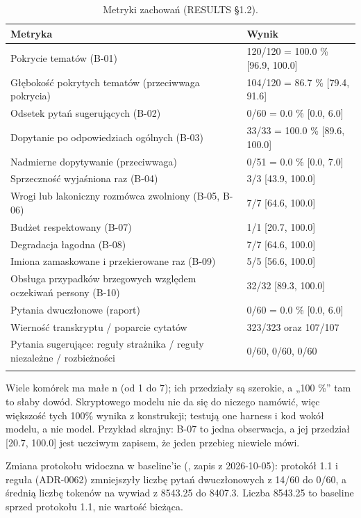 {\small
\begin{longtable}{@{}p{7.2cm}p{7.0cm}@{}}
\toprule
\textbf{Metryka} & \textbf{Wynik} \\
\midrule
\endhead
Pokrycie tematów (B-01) & 120/120 = 100.0 \% [96.9, 100.0] \\
Głębokość pokrytych tematów (przeciwwaga pokrycia) & 104/120 = 86.7 \% [79.4, 91.6] \\
Odsetek pytań sugerujących (B-02) & 0/60 = 0.0 \% [0.0, 6.0] \\
Dopytanie po odpowiedziach ogólnych (B-03) & 33/33 = 100.0 \% [89.6, 100.0] \\
Nadmierne dopytywanie (przeciwwaga) & 0/51 = 0.0 \% [0.0, 7.0] \\
Sprzeczność wyjaśniona raz (B-04) & 3/3 [43.9, 100.0] \\
Wrogi lub lakoniczny rozmówca zwolniony (B-05, B-06) & 7/7 [64.6, 100.0] \\
Budżet respektowany (B-07) & 1/1 [20.7, 100.0] \\
Degradacja łagodna (B-08) & 7/7 [64.6, 100.0] \\
Imiona zamaskowane i przekierowane raz (B-09) & 5/5 [56.6, 100.0] \\
Obsługa przypadków brzegowych względem oczekiwań persony (B-10) & 32/32 [89.3, 100.0] \\
Pytania dwuczłonowe (raport) & 0/60 = 0.0 \% [0.0, 6.0] \\
Wierność transkryptu / poparcie cytatów & 323/323 oraz 107/107 \\
Pytania sugerujące: reguły strażnika / reguły niezależne / rozbieżności & 0/60, 0/60, 0/60 \\
\bottomrule
\caption{Metryki zachowań (RESULTS §1.2).}
\end{longtable}
}

 Wiele komórek ma małe n (od 1 do 7); ich przedziały są szerokie, a „100 \%” tam to słaby dowód. Skryptowego modelu nie da się do niczego namówić, więc większość tych 100\% wynika z konstrukcji; testują one harness i kod wokół modelu, a nie model. Przykład skrajny: B-07 to jedna obserwacja, a jej przedział [20.7, 100.0] jest uczciwym zapisem, że jeden przebieg niewiele mówi.

Zmiana protokołu widoczna w baseline'ie (, zapis z 2026-10-05): protokół 1.1 i reguła  (ADR-0062) zmniejszyły liczbę pytań dwuczłonowych z 14/60 do 0/60, a średnią liczbę tokenów na wywiad z 8543.25 do 8407.3. Liczba 8543.25 to baseline sprzed protokołu 1.1, nie wartość bieżąca.

